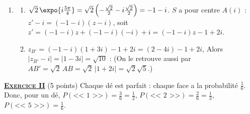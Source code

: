 \begin{enumerate}
   \item
      \begin{enumerate}
         \item {}
            $\sqrt{2}\,\expo{i\frac{5\pi}{4}} = \sqrt{2}\left(-\frac{\sqrt{2}}{2} - i\frac{\sqrt{2}}{2}\right) = -1 - i$.
            $S$ a pour centre $A(i)$ : $z' - i = (-1 - i)(z - i)$, soit $z' = (-1-i)z + (-1-i)(-i) + i = (-1 - i)z - 1 + 2i$.
            \par\noindent{}
         \item {}
            $z_{B'} = (-1 - i)(1 + 3i) - 1 + 2i = (2 - 4i) - 1 + 2i$, 
            Alors $|z_{B'} - i| = |1 - 3i| = \sqrt{10}$ : 
            (On le retrouve aussi par $AB' = \sqrt{2}\,AB = \sqrt{2}\,|1 + 2i| = \sqrt{2}\sqrt{5}$.)
      \end{enumerate}
\end{enumerate}
\noindent \underline{\textsc{\textbf{Exercice II}}} (5 points) \newline
Chaque d\'e est parfait : chaque face a la probabilit\'e $\frac{1}{6}$. Donc, pour un d\'e,
$P(\text{<< 1 >>}) = \frac{3}{6} = \frac{1}{2}$, $P(\text{<< 2 >>}) = \frac{2}{6} = \frac{1}{3}$, $P(\text{<< 5 >>}) = \frac{1}{6}$.
